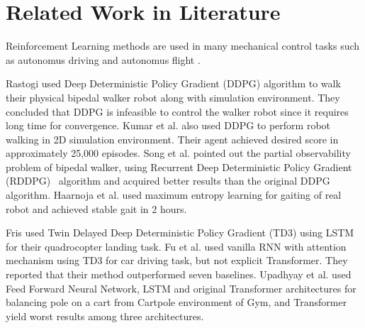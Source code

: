 \section{Related Work in Literature}
\label{sec:related_work}

Reinforcement Learning methods are used in many mechanical control tasks 
such as autonomus driving \cite{pan_virtual_2017, shalev-shwartz_safe_2016, sallab_deep_2017, wang_deep_2019} 
and autonomus flight \cite{kopsa_reinforcement_2018, abbeel_application_2006, santos_experimental_2012}.

Rastogi \cite{rastogi_deep_2017} used Deep Deterministic Policy Gradient (DDPG) algorithm to walk 
their physical bipedal walker robot along with simulation environment. 
They concluded that DDPG is infeasible to control the walker robot 
since it requires long time for convergence. 
Kumar et al. \cite{kumar_bipedal_2018} also used DDPG to perform 
robot walking in 2D simulation environment. 
Their agent achieved desired score in approximately 25,000 episodes. 
Song et al. \cite{song_recurrent_2018} pointed out the partial observability problem of bipedal walker, 
using Recurrent Deep Deterministic Policy Gradient (RDDPG)~\cite{heess_memory-based_2015} algorithm 
and acquired better results than the original DDPG algorithm. 
Haarnoja et al. \cite{haarnoja_learning_2019} used maximum entropy learning for gaiting of real robot and achieved stable gait in 2 hours. 

Fris \cite{fris_landing_2020} used Twin Delayed Deep Deterministic Policy Gradient (TD3) 
using LSTM for their quadrocopter landing task. 
Fu et al. \cite{fu_when_2020} used vanilla RNN with attention mechanism 
using TD3 for car driving task, but not explicit Transformer. 
They reported that their method outperformed seven baselines. 
Upadhyay et al. \cite{upadhyay_transformer_2019} used Feed Forward Neural Network, 
LSTM and original Transformer architectures for balancing pole 
on a cart from Cartpole environment of Gym, and Transformer yield worst results among three architectures.
